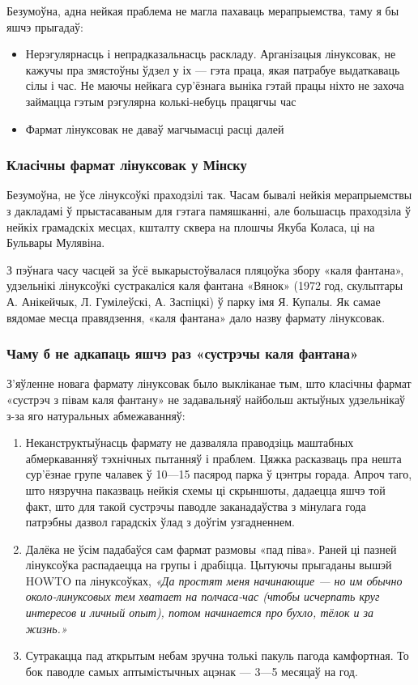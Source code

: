 \documentclass[10pt, a5paper]{article}
\begin{document}
Безумоўна, адна нейкая праблема не магла пахаваць мерапрыемства, таму я бы яшчэ прыгадаў:
\begin{itemize}
  \item Нерэгулярнасць і непрадказальнасць раскладу. Арганізацыя лінуксовак, не кажучы пра змястоўны ўдзел у іх — гэта праца, якая патрабуе выдаткаваць сілы і час. Не маючы нейкага сур'ёзнага выніка гэтай працы ніхто не захоча займацца гэтым рэгулярна колькі-небуць працягчы час
  \item Фармат лінуксовак не даваў магчымасці расці далей
\end{itemize}

\subsubsection*{Класічны фармат лінуксовак у Мінску}

Безумоўна, не ўсе лінуксоўкі праходзілі так. Часам бывалі нейкія мерапрыемствы з дакладамі ў прыстасаваным для гэтага памяшканні, але большасць праходзіла ў нейкіх грамадскіх месцах, кшталту сквера на плошчы Якуба Коласа, ці на Бульвары Мулявіна.

З пэўнага часу часцей за ўсё выкарыстоўвалася пляцоўка збору «каля фантана», удзельнікі лінуксоўкі сустракаліся каля фантана «Вянок» (1972 год, скульптары А. Анікейчык, Л. Гумілеўскі, А. Заспіцкі) ў парку імя Я. Купалы. Як самае вядомае месца правядзення, «каля фантана» дало назву фармату лінуксовак.

\subsubsection*{Чаму б не адкапаць яшчэ раз «сустрэчы каля фантана»}

З'яўленне новага фармату лінуксовак было выкліканае тым, што класічны фармат «сустрэч з півам каля фантану» не задавальняў найбольш актыўных удзельнікаў з-за яго натуральных абмежаванняў:
\begin{enumerate}
  \item Неканструктыўнасць фармату не дазваляла праводзіць маштабных абмеркаванняў тэхнічных пытанняў і праблем. Цяжка расказваць пра нешта сур'ёзнае групе чалавек ў 10—15 пасярод парка ў цэнтры горада. Апроч таго, што нязручна паказваць нейкія схемы ці скрыншоты, дадаецца яшчэ той факт, што для такой сустрэчы паводле заканадаўства з мінулага года патрэбны дазвол гарадскіх ўлад з доўгім узгадненнем.
  \item Далёка не ўсім падабаўся сам фармат размовы «пад піва». Раней ці пазней лінуксоўка распадаецца на групы і драбіцца. Цытуючы прыгаданы вышэй HOWTO па лінуксоўках, \textit{«Да простят меня начинающие — но им обычно около-линуксовых тем хватает на полчаса-час (чтобы исчерпать круг интересов и личный опыт), потом начинается про бухло, тёлок и за жизнь.»}
  \item Сутракацца пад аткрытым небам зручна толькі пакуль пагода камфортная. То бок паводле самых аптымістычных ацэнак — 3—5 месяцаў на год.
\end{enumerate}
\end{document}

